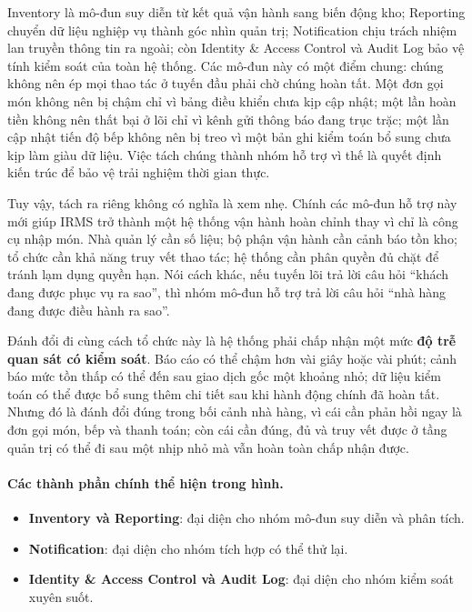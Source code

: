 \documentclass[11pt,a4paper]{article}
\begin{document}
\textsf{Inventory} là mô-đun suy diễn từ kết quả vận hành sang biến động kho; \textsf{Reporting} chuyển dữ liệu nghiệp vụ thành góc nhìn quản trị; \textsf{Notification} chịu trách nhiệm lan truyền thông tin ra ngoài; còn \textsf{Identity \& Access Control} và \textsf{Audit Log} bảo vệ tính kiểm soát của toàn hệ thống. Các mô-đun này có một điểm chung: chúng không nên ép mọi thao tác ở tuyến đầu phải chờ chúng hoàn tất. Một đơn gọi món không nên bị chậm chỉ vì bảng điều khiển chưa kịp cập nhật; một lần hoàn tiền không nên thất bại ở lõi chỉ vì kênh gửi thông báo đang trục trặc; một lần cập nhật tiến độ bếp không nên bị treo vì một bản ghi kiểm toán bổ sung chưa kịp làm giàu dữ liệu. Việc tách chúng thành nhóm hỗ trợ vì thế là quyết định kiến trúc để bảo vệ trải nghiệm thời gian thực.

Tuy vậy, tách ra riêng không có nghĩa là xem nhẹ. Chính các mô-đun hỗ trợ này mới giúp IRMS trở thành một hệ thống vận hành hoàn chỉnh thay vì chỉ là công cụ nhập món. Nhà quản lý cần số liệu; bộ phận vận hành cần cảnh báo tồn kho; tổ chức cần khả năng truy vết thao tác; hệ thống cần phân quyền đủ chặt để tránh lạm dụng quyền hạn. Nói cách khác, nếu tuyến lõi trả lời câu hỏi \enquote{khách đang được phục vụ ra sao}, thì nhóm mô-đun hỗ trợ trả lời câu hỏi \enquote{nhà hàng đang được điều hành ra sao}.

Đánh đổi đi cùng cách tổ chức này là hệ thống phải chấp nhận một mức \textbf{độ trễ quan sát có kiểm soát}. Báo cáo có thể chậm hơn vài giây hoặc vài phút; cảnh báo mức tồn thấp có thể đến sau giao dịch gốc một khoảng nhỏ; dữ liệu kiểm toán có thể được bổ sung thêm chi tiết sau khi hành động chính đã hoàn tất. Nhưng đó là đánh đổi đúng trong bối cảnh nhà hàng, vì cái cần phản hồi ngay là đơn gọi món, bếp và thanh toán; còn cái cần đúng, đủ và truy vết được ở tầng quản trị có thể đi sau một nhịp nhỏ mà vẫn hoàn toàn chấp nhận được.

\paragraph{Các thành phần chính thể hiện trong hình.}
\begin{itemize}
  \item \textbf{Inventory và Reporting}: đại diện cho nhóm mô-đun suy diễn và phân tích.
  \item \textbf{Notification}: đại diện cho nhóm tích hợp có thể thử lại.
  \item \textbf{Identity \& Access Control và Audit Log}: đại diện cho nhóm kiểm soát xuyên suốt.
\end{itemize}
\end{document}
